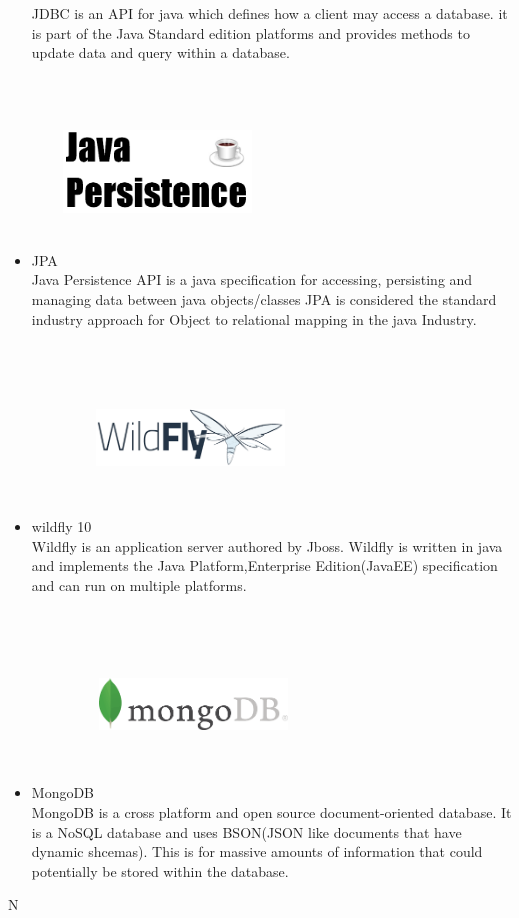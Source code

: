 \documentclass{article}
\begin{document}
\begin{itemize}
	JDBC is an API for java which defines how a client may access a database. it is part of the Java Standard edition platforms and provides methods to update data and query within a database.
	\item JPA
		\includegraphics[width=5cm,height=5cm,keepaspectratio]{jpa.PNG} \\
	Java Persistence API is a java specification for accessing, persisting and managing data between java objects/classes
	JPA is considered the standard industry approach for Object to relational mapping in the java Industry.
	\item wildfly 10
		\includegraphics[width=5cm,height=5cm,keepaspectratio]{wf.png} \\
	Wildfly is an application server authored by Jboss. Wildfly is written in java and implements the Java Platform,Enterprise Edition(JavaEE) specification and can run on multiple platforms.
	\item MongoDB
		\includegraphics[width=5cm,height=5cm,keepaspectratio]{mongo.png} \\
	MongoDB is a cross platform and open source document-oriented database. It is a NoSQL database and uses BSON(JSON like documents that have dynamic shcemas). This is for massive amounts of information that could potentially be stored within the database.
\end{itemize}
N
\end{document}
